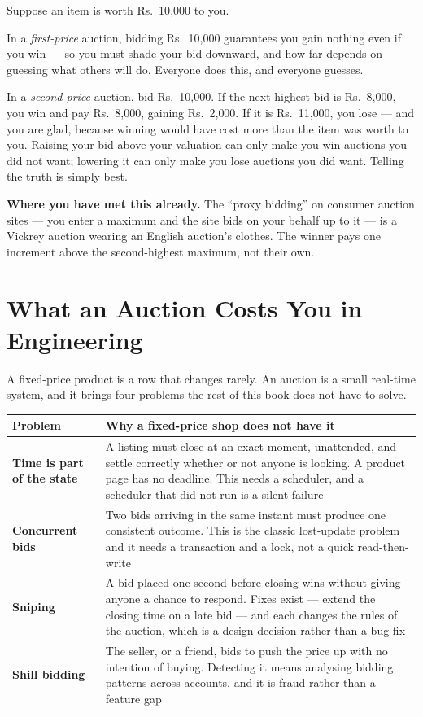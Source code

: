 \begin{conceptbox}
Suppose an item is worth Rs.~10{,}000 to you.

\smallskip
In a \emph{first-price} auction, bidding Rs.~10{,}000 guarantees you gain
nothing even if you win --- so you must shade your bid downward, and how far
depends on guessing what others will do. Everyone does this, and everyone
guesses.

\smallskip
In a \emph{second-price} auction, bid Rs.~10{,}000. If the next highest bid is
Rs.~8{,}000, you win and pay Rs.~8{,}000, gaining Rs.~2{,}000. If it is
Rs.~11{,}000, you lose --- and you are glad, because winning would have cost
more than the item was worth to you. Raising your bid above your valuation can
only make you win auctions you did not want; lowering it can only make you lose
auctions you did want. Telling the truth is simply best.

\smallskip
\textbf{Where you have met this already.} The ``proxy bidding'' on consumer
auction sites --- you enter a maximum and the site bids on your behalf up to it
--- is a Vickrey auction wearing an English auction's clothes. The winner pays
one increment above the second-highest maximum, not their own.
\end{conceptbox}

\section{What an Auction Costs You in Engineering}

A fixed-price product is a row that changes rarely. An auction is a small
real-time system, and it brings four problems the rest of this book does not
have to solve.

\begin{longtable}{@{}L{3.6cm}L{11.4cm}@{}}
\toprule
{}
\textbf{Problem} & \textbf{Why a fixed-price shop does not have it} \\
\midrule
\endhead
\textbf{Time is part of the state} & A listing must close at an exact moment,
unattended, and settle correctly whether or not anyone is looking. A product
page has no deadline. This needs a scheduler, and a scheduler that did not run
is a silent failure \\
\textbf{Concurrent bids} & Two bids arriving in the same instant must produce
one consistent outcome. This is the classic lost-update problem and it needs a
transaction and a lock, not a quick read-then-write \\
\textbf{Sniping} & A bid placed one second before closing wins without giving
anyone a chance to respond. Fixes exist --- extend the closing time on a late
bid --- and each changes the rules of the auction, which is a design decision
rather than a bug fix \\
\textbf{Shill bidding} & The seller, or a friend, bids to push the price up
with no intention of buying. Detecting it means analysing bidding patterns
across accounts, and it is fraud rather than a feature gap \\
\bottomrule
\end{longtable}

